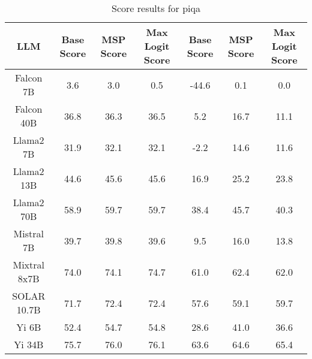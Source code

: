 \renewcommand\arraystretch{1.2}
\begin{table*}
\centering
\begin{tabular}{c|c|c|c|c|c|c}
LLM & Base Score & MSP Score & Max Logit Score & Base Score & MSP Score & Max Logit Score\\ \hline
Falcon 7B & 3.6 & 3.0 & 0.5 & -44.6 & 0.1 & 0.0\\
Falcon 40B & 36.8 & 36.3 & 36.5 & 5.2 & 16.7 & 11.1\\
Llama2 7B & 31.9 & 32.1 & 32.1 & -2.2 & 14.6 & 11.6\\
Llama2 13B & 44.6 & 45.6 & 45.6 & 16.9 & 25.2 & 23.8\\
Llama2 70B & 58.9 & 59.7 & 59.7 & 38.4 & 45.7 & 40.3\\
Mistral 7B & 39.7 & 39.8 & 39.6 & 9.5 & 16.0 & 13.8\\
Mixtral 8x7B & 74.0 & 74.1 & 74.7 & 61.0 & 62.4 & 62.0\\
SOLAR 10.7B & 71.7 & 72.4 & 72.4 & 57.6 & 59.1 & 59.7\\
Yi 6B & 52.4 & 54.7 & 54.8 & 28.6 & 41.0 & 36.6\\
Yi 34B & 75.7 & 76.0 & 76.1 & 63.6 & 64.6 & 65.4\\
\hline
\end{tabular}
\caption{Score results for piqa}
\end{table*}
\label{tab:piqa_score}

